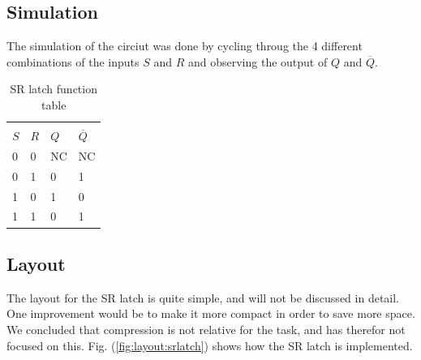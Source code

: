 \documentclass[english, 12pt, a4paper]{ifimaster}
\begin{document}
\subsection{Simulation}
The simulation of the circiut was done by cycling throug the 4 different combinations of the inputs \(S\) and \(R\) and observing the output of \(Q\) and \(\overline{Q}\).



\begin{table}[!ht]
\centering
\begin{tabular}{|l|l|l|l|}
\hline 
			 &			    &			       &			   \\ 	
\(S\)			 & \(R\)		    & \(Q\)		       & \(\overline{Q}\)          \\ \hline
0                        & 0                        & NC            	       & NC             	   \\ \hline
0                        & 1                        & 0                        & 1                         \\ \hline
1                        & 0                        & 1                        & 0                         \\ \hline
1                        & 1                        & 0                        & 1                         \\ \hline
\end{tabular}
\caption{SR latch function table}
\label{table:srlatch:functiontable}
\end{table}

\subsection{Layout}
The layout for the SR latch is quite simple, and will not be discussed in detail. One improvement would be to make it more compact in order to save more space. 
We concluded that compression is not relative for the task, and has therefor not focused on this. Fig. (\ref{fig:layout:srlatch}) shows how the SR latch is implemented. 



\end{document}

